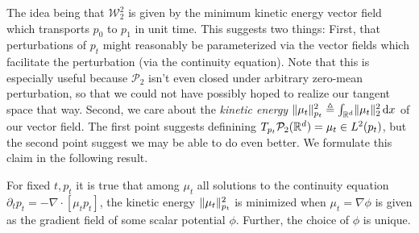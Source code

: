 \documentclass{scrartcl}
\begin{document}
The idea being that $\mathcal{W}_2^2$ is given by the minimum kinetic energy vector field which transports $p_0$ to $p_1$ in unit time. This suggests two things: First, that perturbations of $p_t$ might reasonably be parameterized via the vector fields which facilitate the perturbation (via the continuity equation). Note that this is especially useful because $\mathcal{P}_2$ isn't even closed under arbitrary zero-mean perturbation, so that we could not have possibly hoped to realize our tangent space that way. 
Second, we care about the \textit{kinetic energy} $\norm{\mu_t}^2_{p_t} \triangleq \int_{\RR^d}\norm{\mu_t}_2^2 \d x$ of our vector field. The first point suggests definining $T_{p_t}\mathcal{P}_2(\mathbb{R}^d) = \mu_t \in L^2(p_t)$, but the second point suggest we may be able to do even better. We formulate this claim in the following result.
\begin{resultbox}
For fixed $t, p_t$ it is true that among $\mu_t$ all solutions to the continuity equation $\partial_t p_t = - \nabla \cdot [ \mu_t p_t ]$, the kinetic energy $\lVert\mu_t\rVert^2_{p_t}$ is minimized when $\mu_t = \nabla \phi$ is given as the gradient field of some scalar potential $\phi$. Further, the choice of $\phi$ is unique.
\end{resultbox}
\end{document}
